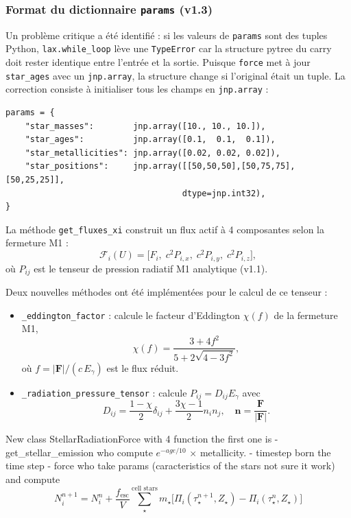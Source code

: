 \documentclass[a4paper, 11pt]{article}
\begin{document}
\subsubsection*{Format du dictionnaire \texttt{params} (v1.3)}
Un problème critique a été identifié : si les valeurs de \texttt{params} sont des tuples Python, \texttt{lax.while\_loop} lève une \texttt{TypeError} car la structure pytree du carry doit rester identique entre l'entrée et la sortie. Puisque \texttt{force} met à jour \texttt{star\_ages} avec un \texttt{jnp.array}, la structure change si l'original était un tuple. La correction consiste à initialiser tous les champs en \texttt{jnp.array} :
\begin{verbatim}
params = {
    "star_masses":        jnp.array([10., 10., 10.]),
    "star_ages":          jnp.array([0.1,  0.1,  0.1]),
    "star_metallicities": jnp.array([0.02, 0.02, 0.02]),
    "star_positions":     jnp.array([[50,50,50],[50,75,75],[50,25,25]],
                                    dtype=jnp.int32),
}
\end{verbatim}
La méthode \texttt{get\_fluxes\_xi} construit un flux actif à 4 composantes selon la fermeture M1 :
\begin{equation}
    \mathcal{F}_i(U) = \bigl[F_i,\; c^2 P_{i,x},\; c^2 P_{i,y},\; c^2 P_{i,z}\bigr],
    \label{eq:rt_flux}
\end{equation}
où $P_{ij}$ est le tenseur de pression radiatif M1 analytique (v1.1).

Deux nouvelles méthodes ont été implémentées pour le calcul de ce tenseur :
\begin{itemize}
    \item \texttt{\_eddington\_factor} : calcule le facteur d'Eddington $\chi(f)$ de la fermeture M1,
    \[
        \chi(f) = \frac{3 + 4f^2}{5 + 2\sqrt{4 - 3f^2}},
    \]
    où $f = |\mathbf{F}| / (c\, E_\gamma)$ est le flux réduit.
    \item \texttt{\_radiation\_pressure\_tensor} : calcule $P_{ij} = D_{ij} E_\gamma$ avec
    \[
        D_{ij} = \frac{1-\chi}{2}\delta_{ij} + \frac{3\chi-1}{2} n_i n_j,\quad
        \mathbf{n} = \frac{\mathbf{F}}{|\mathbf{F}|}.
    \]
\end{itemize}
New class StellarRadiationForce with 4 function the first one is 
- get\_stellar\_emission who compute $e^{-age/10}$ $\times$ metallicity.
- timestep born the time step 
- force who take params (caracteristics of the stars not sure it work) and compute 
\begin{equation}
    N_i^{n+1} = N_i^{n}
    + \frac{f_{\mathrm{esc}}}{V}
    \sum_{\star}^{\text{cell stars}} m_{\star}
    \bigl[ \Pi_i(\tau_{\star}^{n+1}, Z_{\star}) - \Pi_i(\tau_{\star}^{n}, Z_{\star}) \bigr]
    \label{eq:placeholder_label}
\end{equation}
\end{document}
